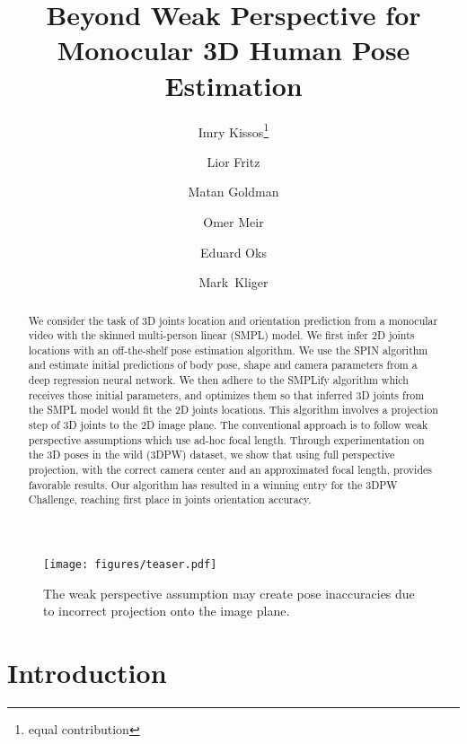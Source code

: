\documentclass[runningheads]{llncs}
\makeatletter
\newcommand{\printfnsymbol}[1]{\textsuperscript{\@fnsymbol{#1}}}
\makeatother
\begin{document}
\pagestyle{headings}
\mainmatter
\def\ECCVSubNumber{100}  

\title{Beyond Weak Perspective for Monocular 3D Human Pose Estimation} 



\author{Imry Kissos\thanks{equal contribution}\and
Lior Fritz\printfnsymbol{1} \and
Matan Goldman \and
Omer Meir \and
Eduard Oks \and
Mark~Kliger 
}
\maketitle

\begin{abstract}
We consider the task of 3D joints location and orientation prediction from a monocular video with the skinned multi-person linear (SMPL) model. We first infer 2D joints locations with an off-the-shelf pose estimation algorithm. We use the SPIN algorithm and estimate initial predictions of body pose, shape and camera parameters from a deep regression neural network. We then adhere to the SMPLify algorithm which receives those initial parameters, and optimizes them so that inferred 3D joints from the SMPL model would fit the 2D joints locations. This algorithm involves a projection step of 3D joints to the 2D image plane. The conventional approach is to follow weak perspective assumptions which use ad-hoc focal length. Through experimentation on the 3D poses in the wild (3DPW) dataset, we show that using full perspective projection, with the correct camera center and an approximated focal length, provides favorable results.  Our algorithm has resulted in a winning entry for the 3DPW Challenge, reaching first place in joints orientation accuracy.
\end{abstract}

\begin{figure}[t]
	\texttt{[image: figures/teaser.pdf]}
	\centering
	\caption{The weak perspective assumption may create pose inaccuracies due to incorrect projection onto the image plane.}
	\label{fig:teaser}
\end{figure}

\section{Introduction}
\end{document}
